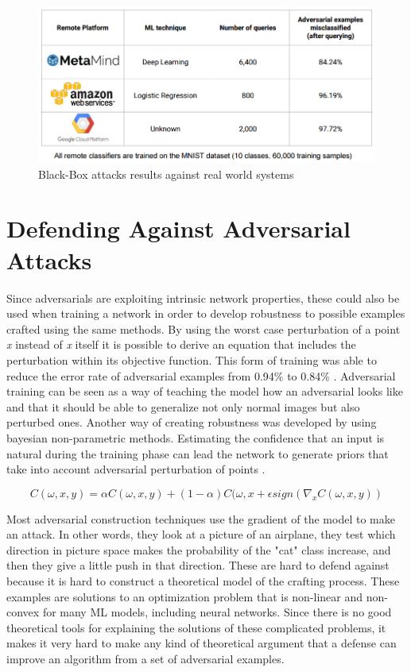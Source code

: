 \begin{figure}[!h]
\centering
	\includegraphics[scale=0.7]{black_box.png}
\caption{Black-Box attacks results against real world systems}
\label{fig:blac_box}
\end{figure}

\section{Defending Against Adversarial Attacks}\label{sec:robustness}

Since adversarials are exploiting intrinsic network properties, these could also be used when training a network in order to develop robustness to possible examples crafted using the same methods. By using the worst case perturbation of a point \textit{x} instead of \textit{x} itself it is possible to derive an equation that includes the perturbation within its objective function. This form of training was able to reduce the error rate of adversarial examples from 0.94\% to 0.84\% \cite{goodfellow2014}. Adversarial training can be seen as a way of teaching the model how an adversarial looks like and that it should be able to generalize not only normal images but also perturbed ones. Another way of creating robustness was developed by using bayesian non-parametric methods. Estimating the confidence that an input is natural during the training phase can lead the network to generate priors that take into account adversarial perturbation of points \cite{billovits}. 

$$ C(\omega,x,y) = \alpha C(\omega ,x,y) + (1-\alpha )C(\omega ,x+\epsilon sign(\nabla_{x}C(\omega,x,y))$$

Most adversarial construction techniques use the gradient of the model to make an attack. In other words, they look at a picture of an airplane, they test which direction in picture space makes the probability of the "cat" class increase, and then they give a little push in that direction. These are hard to defend against because it is hard to construct a theoretical model of the crafting process. These examples are solutions to an optimization problem that is non-linear and non-convex for many ML models, including neural networks. Since there is no good theoretical tools for explaining the solutions of these complicated problems, it makes it very hard to make any kind of theoretical argument that a defense can improve an algorithm from a set of adversarial examples.